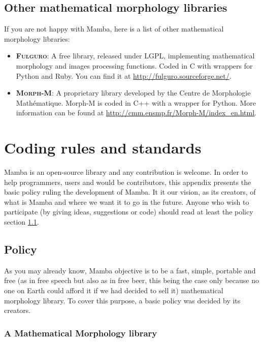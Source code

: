 \documentclass[a4paper,10pt,oneside]{article}
\begin{document}
\subsection{Other mathematical morphology libraries}

If you are not happy with Mamba, here is a list of other mathematical morphology
libraries:

\begin{itemize}
\item \textsc{\textbf{Fulguro}}: A free library, released under LGPL, implementing
mathematical morphology and images processing functions. Coded in C with wrappers
for Python and Ruby. You can find it at \url{http://fulguro.sourceforge.net/}.
\item \textsc{\textbf{Morph-M}}: A proprietary library developed by the Centre
de Morphologie Math\'{e}matique. Morph-M is coded in C++ with a wrapper for
Python. More information can be found at \url{http://cmm.ensmp.fr/Morph-M/index_en.html}.
\end{itemize}


\section{Coding rules and standards}

Mamba is an open-source library and any contribution is welcome. In
order to help programmers, users and would be contributors, this appendix
presents the basic policy ruling the development of Mamba. It it our
vision, as its creators, of what is Mamba and where we want it to go
in the future. Anyone who wish to participate (by giving ideas, suggestions
or code) should read at least the policy section \ref{cha:Policy}.

\subsection{Policy}
\label{cha:Policy}

As you may already know, Mamba objective is to be a fast, simple,
portable and free (as in free speech but also as in free beer, this
being the case only because no one on Earth could afford it if we
had decided to sell it) mathematical morphology library. To cover
this purpose, a basic policy was decided by its creators.


\subsubsection{A Mathematical Morphology library}
\end{document}
